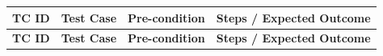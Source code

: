 \documentclass[11pt,a4paper]{article}
\begin{document}
\small
\begin{longtable}{|L{1.2cm}|L{3.3cm}|L{3.9cm}|L{6.0cm}|}
	\hline
	\textbf{TC ID} & \textbf{Test Case}                                                   & \textbf{Pre-condition}                                                 & \textbf{Steps / Expected Outcome}                                                                                                                                                                                                                                                                               \\
	\hline
	\endfirsthead
	\hline
	\textbf{TC ID} & \textbf{Test Case}                                                   & \textbf{Pre-condition}                                                 & \textbf{Steps / Expected Outcome}                                                                                                                                                                                                                                                                               \\
	\hline
	\endhead


\end{longtable}
\end{document}
